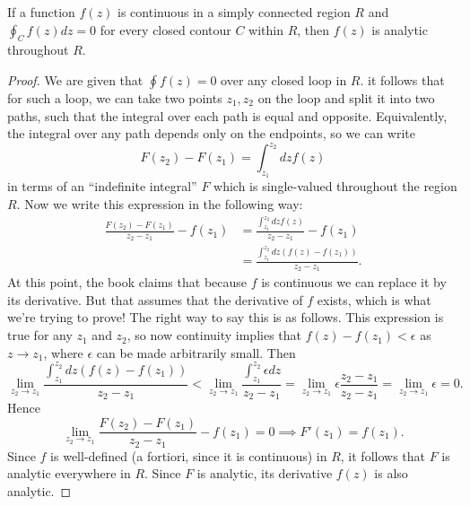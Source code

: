 \begin{thm}[Morera]
    If a function $f(z)$ is continuous in a simply connected region $R$ and $\oint_C f(z) dz=0$ for every closed contour $C$ within $R$, then $f(z)$ is analytic throughout $R$.
\end{thm}
\begin{proof}
    We are given that $\oint f(z)=0$ over any closed loop in $R$. it follows that for such a loop, we can take two points $z_1,z_2$ on the loop and split it into two paths, such that the integral over each path is equal and opposite. Equivalently, the integral over any path depends only on the endpoints, so we can write
    \begin{equation}
        F(z_2)-F(z_1) = \int_{z_1}^{z_2} dz f(z)
    \end{equation}
    in terms of an ``indefinite integral'' $F$ which is single-valued throughout the region $R$.
    Now we write this expression in the following way:
    \begin{align*}
        \frac{F(z_2)-F(z_1)}{z_2-z_1} -f(z_1) &= \frac{\int_{z_1}^{z_2} dz f(z) }{z_2-z_1} -f(z_1)\\
            &=\frac{\int_{z_1}^{z_2} dz (f(z)-f(z_1)) }{z_2-z_1}.
    \end{align*}
    At this point, the book claims that because $f$ is continuous we can replace it by its derivative. But that assumes that the derivative of $f$ exists, which is what we're trying to prove! The right way to say this is as follows. This expression is true for any $z_1$ and $z_2$, so now continuity implies that $f(z) - f(z_1) <\epsilon$ as $z\to z_1$, where $\epsilon$ can be made arbitrarily small. Then
    \begin{equation}
        \lim_{z_2\to z_1} \frac{\int_{z_1}^{z_2} dz (f(z)-f(z_1)) }{z_2-z_1} < \lim_{z_2\to z_1} \frac{\int_{z_1}^{z_2}\epsilon dz}{z_2-z_1}=\lim_{z_2\to z_1} \epsilon \frac{z_2-z_1}{z_2-z_1} = \lim_{z_2\to z_1} \epsilon = 0.
    \end{equation}
    Hence
    \begin{equation}
        \lim_{z_2 \to z_1} \frac{F(z_2)-F(z_1)}{z_2-z_1} -f(z_1) =0 \implies F'(z_1) = f(z_1).
    \end{equation}
    Since $f$ is well-defined (a fortiori, since it is continuous) in $R$, it follows that $F$ is analytic everywhere in $R$. Since $F$ is analytic, its derivative $f(z)$ is also analytic.
\end{proof}

